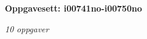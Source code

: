 \centerline{\bf Oppgavesett: i00741no-i00750no}
\vskip 10pt
\centerline{\it 10 oppgaver}\vskip 10pt
\vskip 10pt
